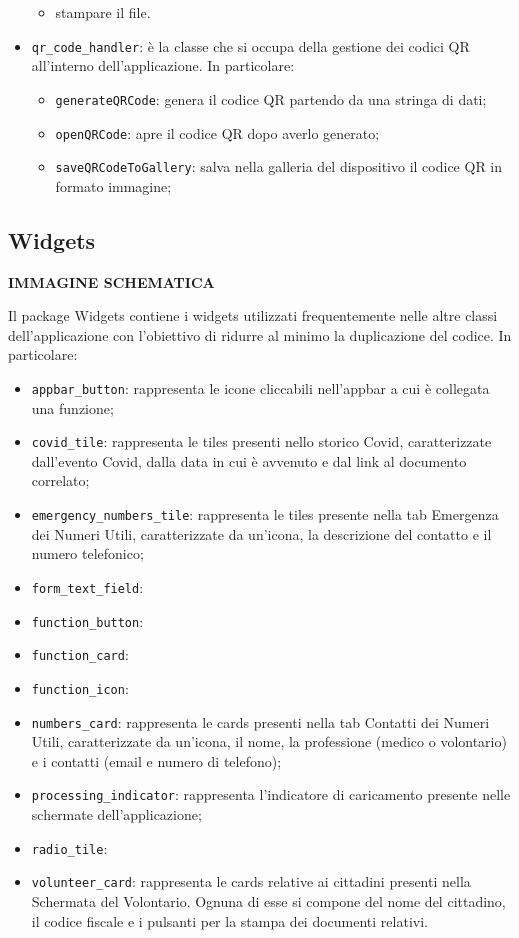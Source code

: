 \documentclass[12pt,a4paper,twoside,openright,titlepage]{book}
\begin{document}
\begin{itemize}
\begin{itemize}
\item stampare il file.
\end{itemize}
\item \texttt{qr\_code\_handler}: è la classe che si occupa della gestione dei codici QR all'interno dell'applicazione. In particolare:
\begin{itemize}
\item \texttt{generateQRCode}: genera il codice QR partendo da una stringa di dati;
\item \texttt{openQRCode}: apre il codice QR dopo averlo generato;
\item \texttt{saveQRCodeToGallery}: salva nella galleria del dispositivo il codice QR in formato immagine;
\end{itemize}
\end{itemize}

\subsection{Widgets}
\textbf{IMMAGINE SCHEMATICA}\newline

Il package Widgets contiene i widgets utilizzati frequentemente nelle altre classi dell'applicazione con l'obiettivo di ridurre al minimo la duplicazione del codice. In particolare:
\begin{itemize}
\item \texttt{appbar\_button}: rappresenta le icone cliccabili nell'appbar a cui è collegata una funzione;
\item \texttt{covid\_tile}: rappresenta le tiles presenti nello storico Covid, caratterizzate dall'evento Covid, dalla data in cui è avvenuto e dal link al documento correlato;
\item \texttt{emergency\_numbers\_tile}: rappresenta le tiles presente nella tab Emergenza dei Numeri Utili, caratterizzate da un'icona, la descrizione del contatto e il numero telefonico;
\item \texttt{form\_text\_field}:
\item \texttt{function\_button}:
\item \texttt{function\_card}:
\item \texttt{function\_icon}:
\item \texttt{numbers\_card}: rappresenta le cards presenti nella tab Contatti dei Numeri Utili, caratterizzate da un'icona, il nome, la professione (medico o volontario) e i contatti (email e numero di telefono);
\item \texttt{processing\_indicator}: rappresenta l'indicatore di caricamento presente nelle schermate dell'applicazione;
\item \texttt{radio\_tile}:
\item \texttt{volunteer\_card}: rappresenta le cards relative ai cittadini presenti nella Schermata del Volontario. Ognuna di esse si compone del nome del cittadino, il codice fiscale e i pulsanti per la stampa dei documenti relativi.
\end{itemize}
\end{document}

